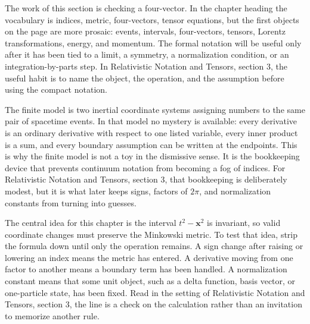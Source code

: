











The work of this section is checking a four-vector.  In the chapter heading the vocabulary is indices, metric, four-vectors, tensor equations, but the first objects on the page are more prosaic: events, intervals, four-vectors, tensors, Lorentz transformations, energy, and momentum.  The formal notation will be useful only after it has been tied to a limit, a symmetry, a normalization condition, or an integration-by-parts step.  In Relativistic Notation and Tensors, section 3, the useful habit is to name the object, the operation, and the assumption before using the compact notation.

The finite model is two inertial coordinate systems assigning numbers to the same pair of spacetime events.  In that model no mystery is available: every derivative is an ordinary derivative with respect to one listed variable, every inner product is a sum, and every boundary assumption can be written at the endpoints.  This is why the finite model is not a toy in the dismissive sense.  It is the bookkeeping device that prevents continuum notation from becoming a fog of indices.  For Relativistic Notation and Tensors, section 3, that bookkeeping is deliberately modest, but it is what later keeps signs, factors of \(2\pi\), and normalization constants from turning into guesses.

The central idea for this chapter is the interval \(t^2-\bm x^2\) is invariant, so valid coordinate changes must preserve the Minkowski metric.  To test that idea, strip the formula down until only the operation remains.  A sign change after raising or lowering an index means the metric has entered.  A derivative moving from one factor to another means a boundary term has been handled.  A normalization constant means that some unit object, such as a delta function, basis vector, or one-particle state, has been fixed.  Read in the setting of Relativistic Notation and Tensors, section 3, the line is a check on the calculation rather than an invitation to memorize another rule.

